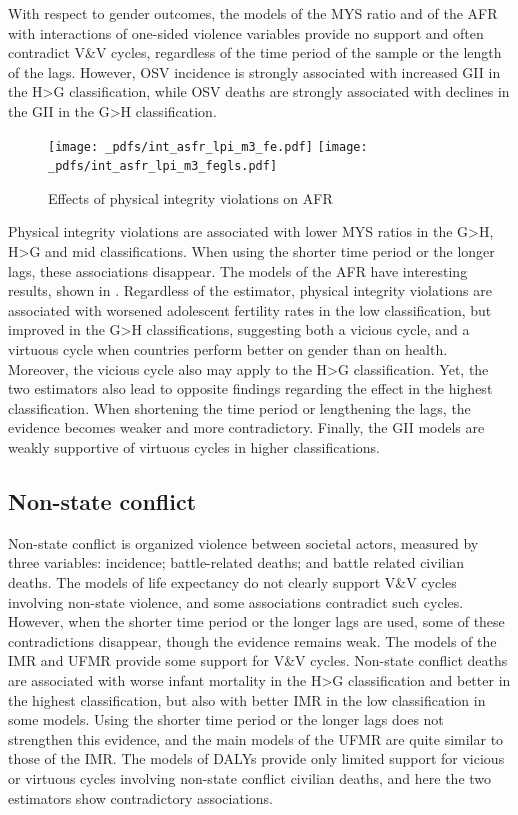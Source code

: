 \documentclass[12pt]{article}
\begin{document}
With respect to gender outcomes, the models of the MYS ratio and of the AFR with interactions of one-sided violence variables provide no support and often contradict V\&V cycles, regardless of the time period of the sample or the length of the lags. However, OSV incidence is strongly associated with increased GII in the H>G classification, while OSV deaths are strongly associated with declines in the GII in the G>H classification.

\begin{figure}[!htb]
    \centering
    \caption{Effects of physical integrity violations on AFR}
    \label{int_asfr_lpi}
    \texttt{[image: \_pdfs/int\_asfr\_lpi\_m3\_fe.pdf]}
    \texttt{[image: \_pdfs/int\_asfr\_lpi\_m3\_fegls.pdf]}
\end{figure}

Physical integrity violations are associated with lower MYS ratios in the G>H, H>G and mid classifications. When using the shorter time period or the longer lags, these associations disappear. The models of the AFR have interesting results, shown in . Regardless of the estimator, physical integrity violations are associated with worsened adolescent fertility rates in the low classification, but improved in the G>H classifications, suggesting both a vicious cycle, and a virtuous cycle when countries perform better on gender than on health. Moreover, the vicious cycle also may apply to the H>G classification. Yet, the two estimators also lead to opposite findings regarding the effect in the highest classification. When shortening the time period or lengthening the lags, the evidence becomes weaker and more contradictory.
Finally, the GII models are weakly supportive of virtuous cycles in higher classifications.

\subsection{Non-state conflict}

Non-state conflict is organized violence between societal actors, measured by three variables: incidence; battle-related deaths; and battle related civilian deaths. The models of life expectancy do not clearly support V\&V cycles involving non-state violence, and some associations contradict such cycles. However, when the shorter time period or the longer lags are used, some of these contradictions disappear, though the evidence remains weak.
The models of the IMR and UFMR provide some support for V\&V cycles. Non-state conflict deaths are associated with worse infant mortality in the H>G classification and better in the highest classification, but also with better IMR in the low classification in some models. Using the shorter time period or the longer lags does not strengthen this evidence, and the main models of the UFMR are quite similar to those of the IMR. The models of DALYs provide only limited support for vicious or virtuous cycles involving non-state conflict civilian deaths, and here the two estimators show contradictory associations.
\end{document}
